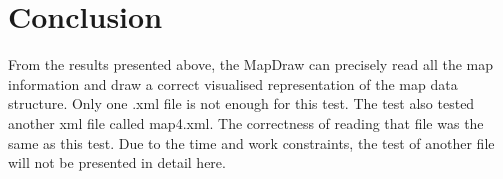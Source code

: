 \documentclass[11pt, a4paper]{article}
\begin{document}
\section{Conclusion}

From the results presented above, the MapDraw can precisely read all the map information and draw a correct visualised representation of the map data structure. Only one .xml file is not enough for this test. The test also tested another xml file called map4.xml. The correctness of reading that file was the same as this test. Due to the time and work constraints, the test of another file will not be presented in detail here.
\end{document}
